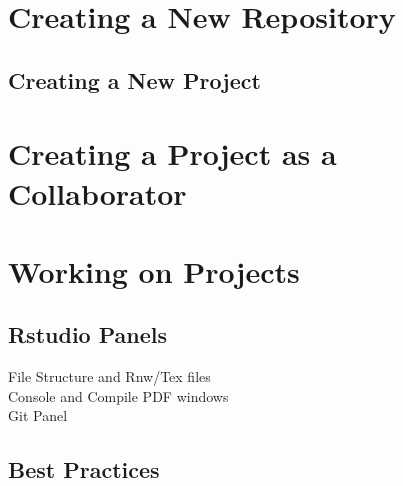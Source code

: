 \documentclass{article}
\begin{document}
\section{Creating a New Repository}

\subsection{Creating a New Project}

\section{Creating a Project as a Collaborator}


\section{Working on Projects}

\subsection{Rstudio Panels}

\begin{description}
  \item[File Structure and Rnw/Tex files]
  \item[Console and Compile PDF windows]
  \item[Git Panel]
\end{description}


\subsection{Best Practices}
\end{document}

